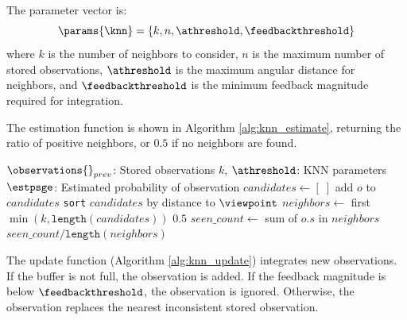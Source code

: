 The parameter vector is:
$$
    \params{\knn} = \{k, n, \athreshold, \feedbackthreshold\}
$$
where $k$ is the number of neighbors to consider, $n$ is the maximum number of stored observations, $\athreshold$ is the maximum angular distance for neighbors, and $\feedbackthreshold$ is the minimum feedback magnitude required for integration.

The estimation function is shown in Algorithm \ref{alg:knn_estimate}, returning the ratio of positive neighbors, or $0.5$ if no neighbors are found.

\begin{singlespace}
    \begin{algorithm}[H]
        \caption[KNN Observability Estimation]{KNN $\estimate{\viewpoint}$}
        \label{alg:knn_estimate}
        \begin{algorithmic}
            \Require $\observations{}_{prev}$: Stored observations
            \Require $k$, $\athreshold$: KNN parameters
            \Ensure $\estpsge$: Estimated probability of observation
            \Function{$\estimate$}{$\viewpoint$}
            \State $candidates \gets [\;]$
            \State add $o$ to $candidates$
            \EndIf
            \EndFor
            \State \texttt{sort} $candidates$ by distance to $\viewpoint$
            \State $neighbors \gets$ first $\min(k, \texttt{length}(candidates))$
            \State \Return $0.5$
            \EndIf
            \State $seen\_count \gets$ sum of $o.s$ in $neighbors$
            \State \Return $seen\_count / \texttt{length}(neighbors)$
            \EndFunction
        \end{algorithmic}
    \end{algorithm}
\end{singlespace}

The update function (Algorithm \ref{alg:knn_update}) integrates new observations. If the buffer is not full, the observation is added. If the feedback magnitude is below $\feedbackthreshold$, the observation is ignored. Otherwise, the observation replaces the nearest inconsistent stored observation.

